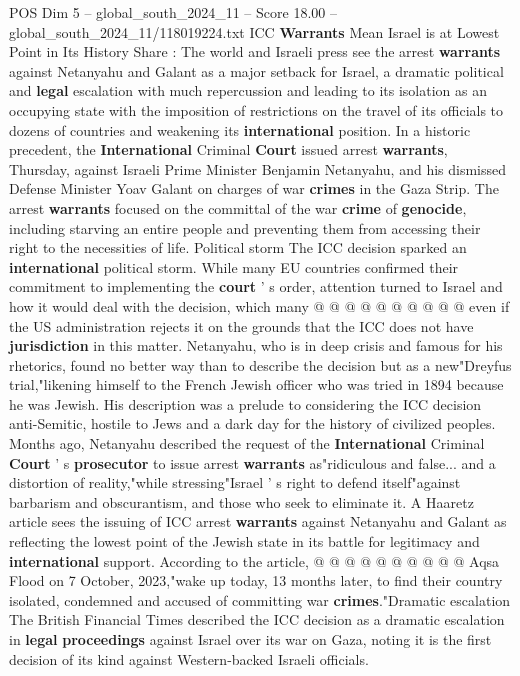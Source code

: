 \begin{textsample}{POS Dim 5 – global\_south\_2024\_11 – Score 18.00 – global\_south\_2024\_11/118019224.txt}  \label{ex:f5_pos_028}
ICC \textbf{Warrants} Mean Israel is at Lowest Point in Its History Share : The world and Israeli press see the arrest \textbf{warrants} against Netanyahu and Galant as a major setback for Israel, a dramatic political and \textbf{legal} escalation with much repercussion and leading to its isolation as an occupying state with the imposition of restrictions on the travel of its officials to dozens of countries and weakening its \textbf{international} position.
In a historic precedent, the \textbf{International} Criminal \textbf{Court} issued arrest \textbf{warrants}, Thursday, against Israeli Prime Minister Benjamin Netanyahu, and his dismissed Defense Minister Yoav Galant on charges of war \textbf{crimes} in the Gaza Strip.
The arrest \textbf{warrants} focused on the committal of the war \textbf{crime} of \textbf{genocide}, including starving an entire people and preventing them from accessing their right to the necessities of life.
Political storm The ICC decision sparked an \textbf{international} political storm.
While many EU countries confirmed their commitment to implementing the \textbf{court} ' s order, attention turned to Israel and how it would deal with the decision, which many @ @ @ @ @ @ @ @ @ @ even if the US administration rejects it on the grounds that the ICC does not have \textbf{jurisdiction} in this matter.
Netanyahu, who is in deep crisis and famous for his rhetorics, found no better way than to describe the decision but as a new"Dreyfus trial,"likening himself to the French Jewish officer who was tried in 1894 because he was Jewish.
His description was a prelude to considering the ICC decision anti-Semitic, hostile to Jews and a dark day for the history of civilized peoples.
Months ago, Netanyahu described the request of the \textbf{International} Criminal \textbf{Court} ' s \textbf{prosecutor} to issue arrest \textbf{warrants} as"ridiculous and false... and a distortion of reality,"while stressing"Israel ' s right to defend itself"against barbarism and obscurantism, and those who seek to eliminate it.
A Haaretz article sees the issuing of ICC arrest \textbf{warrants} against Netanyahu and Galant as reflecting the lowest point of the Jewish state in its battle for legitimacy and \textbf{international} support.
According to the article, @ @ @ @ @ @ @ @ @ @ Aqsa Flood on 7 October, 2023,"wake up today, 13 months later, to find their country isolated, condemned and accused of committing war \textbf{crimes}."Dramatic escalation The British Financial Times described the ICC decision as a dramatic escalation in \textbf{legal} \textbf{proceedings} against Israel over its war on Gaza, noting it is the first decision of its kind against Western-backed Israeli officials.

\end{textsample}
